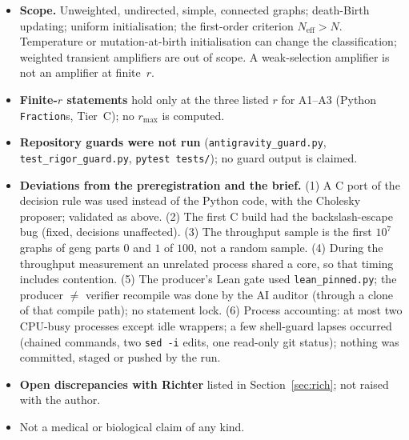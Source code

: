 \documentclass[10pt]{article}
\newcommand{\Neff}{N_{\mathrm{eff}}}
\begin{document}
\begin{itemize}
\item \textbf{Scope.} Unweighted, undirected, simple, connected graphs; death-Birth updating; uniform initialisation; the first-order criterion $\Neff>N$. Temperature or mutation-at-birth initialisation can change the classification; weighted transient amplifiers are out of scope. A weak-selection amplifier is not an amplifier at finite~$r$.
\item \textbf{Finite-$r$ statements} hold only at the three listed $r$ for A1--A3 (Python \texttt{Fraction}s, Tier~C); no $r_{\max}$ is computed.
\item \textbf{Repository guards were not run} (\texttt{antigravity\_guard.py}, \texttt{test\_rigor\_guard.py}, \texttt{pytest tests/}); no guard output is claimed.
\item \textbf{Deviations from the preregistration and the brief.} (1) A C port of the decision rule was used instead of the Python code, with the Cholesky proposer; validated as above. (2) The first C build had the backslash-escape bug (fixed, decisions unaffected). (3) The throughput sample is the first $10^7$ graphs of geng parts $0$ and $1$ of $100$, not a random sample. (4) During the throughput measurement an unrelated process shared a core, so that timing includes contention. (5) The producer's Lean gate used \texttt{lean\_pinned.py}; the producer $\ne$ verifier recompile was done by the AI auditor (through a clone of that compile path); no statement lock. (6) Process accounting: at most two CPU-busy processes except idle wrappers; a few shell-guard lapses occurred (chained commands, two \texttt{sed -i} edits, one read-only git status); nothing was committed, staged or pushed by the run.
\item \textbf{Open discrepancies with Richter} listed in Section~\ref{sec:rich}; not raised with the author.
\item Not a medical or biological claim of any kind.
\end{itemize}

\end{document}
